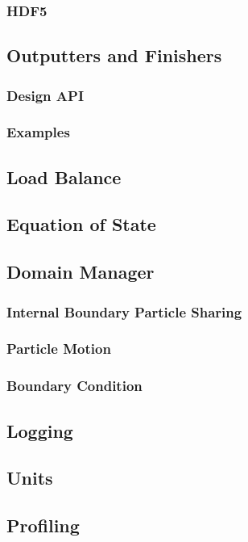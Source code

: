 \subsubsection{HDF5}

\subsection{Outputters and Finishers}
\subsubsection{Design API}
\subsubsection{Examples}

\subsection{Load Balance}

\subsection{Equation of State}

\subsection{Domain Manager}
\subsubsection{Internal Boundary Particle Sharing}
\subsubsection{Particle Motion}
\subsubsection{Boundary Condition}

\subsection{Logging}

\subsection{Units}

\subsection{Profiling}
